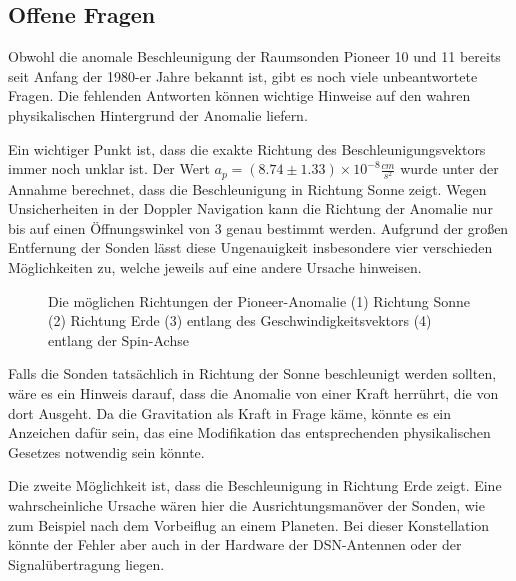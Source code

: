 \subsection{Offene Fragen}

Obwohl die anomale Beschleunigung der Raumsonden Pioneer 10 und 11
bereits seit Anfang der 1980-er Jahre bekannt ist, gibt es noch viele
unbeantwortete Fragen\cite{Turyshev2010}. Die fehlenden Antworten
k\"onnen wichtige Hinweise auf den wahren physikalischen Hintergrund
der Anomalie liefern.




Ein wichtiger Punkt ist, dass die exakte Richtung des
Beschleunigungsvektors immer noch unklar ist. Der Wert $a_{p}=(8.74\pm
1.33)\times 10^{-8}\frac{\mathit{cm}}{s^{2}}$ wurde unter der Annahme
berechnet, dass die Beschleunigung in Richtung Sonne zeigt. Wegen
Unsicherheiten in der Doppler Navigation kann die Richtung der Anomalie
nur bis auf einen \"Offnungswinkel von 3{\textordmasculine} genau
bestimmt werden. Aufgrund der gro{\ss}en Entfernung der Sonden l\"asst
diese Ungenauigkeit insbesondere vier verschieden M\"oglichkeiten zu,
welche jeweils auf eine andere Ursache hinweisen.


\begin{figure}[htbn]
\begin{center}
\noindent    
{}
\end{center}
\vskip -10pt
  \caption{Die möglichen Richtungen der Pioneer-Anomalie (1) Richtung Sonne (2) Richtung Erde (3) entlang des Geschwindigkeitsvektors (4) entlang der Spin-Achse\cite{Turyshev2010}}
\label{fig:richtung}
\end{figure} 



Falls die Sonden tats\"achlich in Richtung der Sonne beschleunigt werden
sollten, w\"are es ein Hinweis darauf, dass die Anomalie von einer
Kraft herr\"uhrt, die von dort Ausgeht. Da die Gravitation als Kraft in
Frage k\"ame, k\"onnte es ein Anzeichen daf\"ur sein, das eine
Modifikation das entsprechenden physikalischen Gesetzes notwendig
sein könnte.




Die zweite M\"oglichkeit ist, dass die Beschleunigung in Richtung Erde
zeigt. Eine wahrscheinliche Ursache w\"aren hier die
Ausrichtungsman\"over der Sonden, wie zum Beispiel nach dem Vorbeiflug
an einem Planeten. Bei dieser Konstellation k\"onnte der Fehler aber
auch in der Hardware der DSN-Antennen oder der Signal\"ubertragung
liegen.




